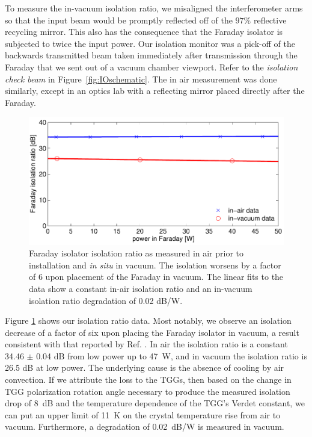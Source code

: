 To measure the in-vacuum isolation ratio, we misaligned the
interferometer arms so that the input beam would be 
promptly reflected off of the $97\%$ reflective recycling mirror. This
also has the consequence that 
the Faraday isolator is subjected to twice the input
power. Our isolation monitor was a pick-off of the backwards 
transmitted beam taken immediately after transmission
through the Faraday that we sent out of a vacuum chamber
viewport. Refer to the \emph{isolation check beam} in 
Figure~\ref{fig:IOschematic}. The in air measurement was done similarly,
except in an optics lab with a reflecting mirror placed directly after
the Faraday. 

\begin{figure}
\begin{centering}
\includegraphics[width=1.0\columnwidth]{figures/FaradayIR.pdf}
\caption[Faraday isolator isolation ratio as measured in air and in
vacuum]{Faraday isolator isolation ratio as measured in air prior to
  installation and \emph{in situ} in vacuum. The isolation worsens by
  a factor of 6 upon placement of the Faraday in vacuum. The linear
  fits to the data show a constant in-air isolation ratio and an
  in-vacuum isolation ratio degradation of 0.02 dB/W.}
\label{fig:IR}
\end{centering}
\end{figure}

Figure \ref{fig:IR} shows our isolation ratio data. Most notably, we
observe an isolation decrease of a factor of six upon placing the
Faraday isolator in vacuum, a result consistent with that reported by
Ref. \citep{TheVIRGOCollaboration2008Invacuum}. In air the isolation
ratio is a constant 34.46 $\pm$ 0.04 dB from low power up to 47~W, and
in vacuum the isolation ratio is 26.5 dB at low power. The underlying
cause is the absence of cooling by air convection. If we attribute the
loss to the TGGs, then based on the change in TGG polarization
rotation angle necessary to produce the measured isolation drop of
8~dB and the temperature dependence of the TGG's Verdet constant, we
can put an upper limit of 11~K on the crystal temperature rise from
air to vacuum. Furthermore, a degradation of 0.02~dB/W is measured in
vacuum.

